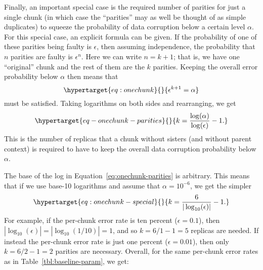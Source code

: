 
Finally, an important special case is the required number of parities
for just a single chunk (in which case the ``parities'' may as well be
thought of as simple duplicates) to squeeze the probability of data
corruption below a certain level \(\alpha\). For this special case, an
explicit formula can be given. If the probability of one of these
parities being faulty is \(\epsilon\), then assuming independence, the
probability that \(n\) parities are faulty is \(\epsilon^n\). Here we
can write \(n = k + 1\); that is, we have one ``original'' chunk and the
rest of them are the \(k\) parities. Keeping the overall error
probability below \(\alpha\) then means that
\begin{equation}\protect\hypertarget{eq:onechunk}{}{
\epsilon^{k+1}
= \alpha
}\label{eq:onechunk}\end{equation} must be satisfied. Taking logarithms
on both sides and rearranging, we get
\begin{equation}\protect\hypertarget{eq-onechunk-parities}{}{
k
= \frac{\log(\alpha)}{\log(\epsilon)} - 1 .
}\label{eq:onechunk-parities}\end{equation} This is the number of
replicas that a chunk without sisters (and without parent context) is required to have to keep the overall data
corruption probability below \(\alpha\).

The base of the log in Equation~\ref{eq:onechunk-parities} is arbitrary.
This means that if we use base-10 logarithms and assume that
\(\alpha = 10^{-6}\), we get the simpler
\begin{equation}\protect\hypertarget{eq:onechunk-special}{}{
k
= \frac{6}{|\log_{10}(\epsilon)|} - 1 .
}\label{eq-onechunk-special}\end{equation} For example, if the per-chunk
error rate is ten percent (\(\epsilon = 0.1\)), then
\(|\log_{10}(\epsilon)| = |\log_{10}(1/10)| = 1\), and so
\(k = 6/1 - 1 = 5\) replicas are needed. If instead the per-chunk error
rate is just one percent (\(\epsilon = 0.01\)), then only
\(k = 6/2 - 1 = 2\) parities are necessary. Overall, for the same per-chunk error rates as in
Table~\ref{tbl:baseline-param}, we get:

